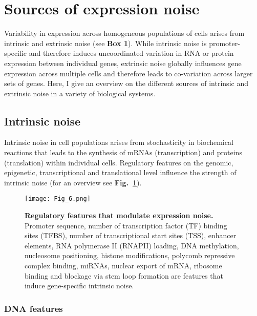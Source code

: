 
\section{Sources of expression noise} 

Variability in expression across homogeneous populations of cells arises from intrinsic and extrinsic noise (see \textbf{Box 1}). While intrinsic noise is promoter-specific and therefore induces uncoordinated variation in RNA or protein expression between individual genes, extrinsic noise globally influences gene expression across multiple cells and therefore leads to co-variation across larger sets of genes. Here, I give an overview on the different sources of intrinsic and extrinsic noise in a variety of biological systems.

\subsection{Intrinsic noise}

Intrinsic noise in cell populations arises from stochasticity in biochemical reactions that leads to the synthesis of mRNAs (transcription) and proteins (translation) within individual cells. Regulatory features on the genomic, epigenetic, transcriptional and translational level influence the strength of intrinsic noise (for an overview see \textbf{Fig.~\ref{fig0:overview_intrinsic}}).

\begin{figure}[!h]
\centering
\texttt{[image: Fig\_6.png]}
\caption[Regulatory features that modulate expression noise]{\textbf{Regulatory features that modulate expression noise.}\\
Promoter sequence, number of transcription factor (TF) binding sites (TFBS), number of transcriptional start sites (TSS), enhancer elements, RNA polymerase II (RNAPII) loading, DNA methylation, nucleosome positioning, histone modifications, polycomb repressive complex binding, \glspl{miRNA}, nuclear export of mRNA, ribosome binding and blockage via stem loop formation are features that induce gene-specific intrinsic noise.}
\label{fig0:overview_intrinsic}
\end{figure}

\subsubsection{DNA features}

